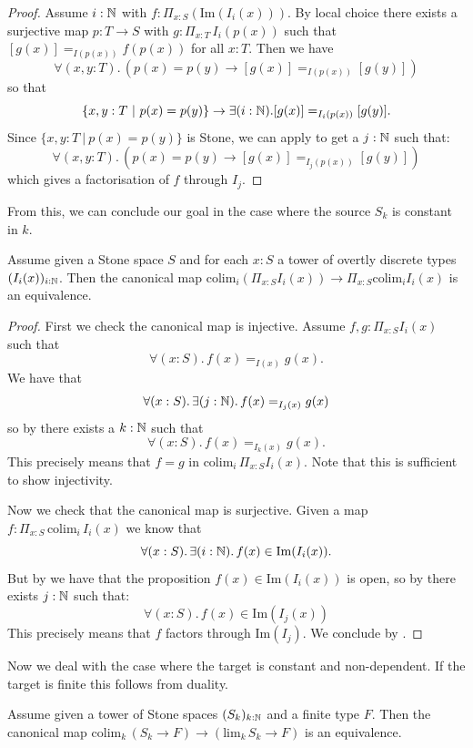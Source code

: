 \begin{proof}
  Assume $i:\mathbb{N}$ with $f:\Pi_{x:S}(\mathrm{Im}(I_i(x)))$. By local choice there exists a surjective map $p:T\to S$
with $g:\Pi_{x:T}\, I_i(p(x))$ such that $[g(x)] =_{I(p(x))} f(p(x))$ for all $x:T$.
Then we have
\[\forall(x,y:T).\, (p(x)=p(y) \to [g(x)] =_{I(p(x))} [g(y)])\]
so that
\[ \{x,y:T\ |\ p(x)=p(y)\} \to \exists(i:\mathbb{N}). [g(x)] =_{I_i(p(x))} [g(y)].\]
Since $\{x,y:T\ |\ p(x)=p(y)\}$ is Stone, we can apply  to get a $j:\mathbb{N}$ such that:
\[\forall(x,y:T).\, (p(x)=p(y) \to [g(x)] =_{I_j(p(x))} [g(y)])\]
which gives a factorisation of $f$ through $I_j$.
\end{proof}

From this, we can conclude our goal in the case where the source $S_k$ is constant in $k$. 
\begin{proposition}\label{scott-continuity-right}
Assume given a Stone space $S$ and for each $x:S$ a tower of overtly discrete types $(I_i(x))_{i:\mathbb{N}}$. Then the canonical map $\mathrm{colim}_i (\Pi_{x:S} I_i(x)) \to \Pi_{x:S} \mathrm{colim}_i I_i(x)$ is an equivalence.
\end{proposition}

\begin{proof}
First we check the canonical map is injective. Assume $f,g:\Pi_{x:S} I_i(x)$ such that
\[\forall(x:S).\, f(x) =_{I(x)} g(x).\]
We have that
\[\forall(x:S).\, \exists(j:\mathbb{N}).\, f(x) =_{I_j(x)} g(x)\]
so by  there exists a $k:\mathbb{N}$ such that
\[\forall(x:S).\, f(x) =_{I_k(x)} g(x).\]
This precisely means that $f=g$ in $\mathrm{colim}_i\, \Pi_{x:S} I_i(x)$. Note that this is sufficient to show injectivity. 

Now we check that the canonical map is surjective. Given a map $f: \Pi_{x:S}\, \mathrm{colim}_i\, I_i(x)$ we know that
\[\forall(x:S).\, \exists(i:\mathbb{N}).\, f(x)\in \mathrm{Im}(I_i(x)).\]
But by  we have that the proposition $f(x)\in \mathrm{Im}(I_i(x))$ is open, so by  there exists $j:\mathbb{N}$ such that:
\[\forall(x:S).\, f(x)\in \mathrm{Im}(I_j(x))\]
This precisely means that $f$ factors through $\mathrm{Im}(I_j)$. We conclude by .
\end{proof}

Now we deal with the case where the target is constant and non-dependent. If the target is finite this follows from duality.

\begin{lemma}\label{factorisation-stone-finite}
Assume given a tower of Stone spaces $(S_k)_{k:\mathbb{N}}$ and a finite type $F$. Then the canonical map $\mathrm{colim}_k\,(S_k\to F)\to \left(\mathrm{lim}_k\,S_k\to F\right)$ is an equivalence.
\end{lemma}

